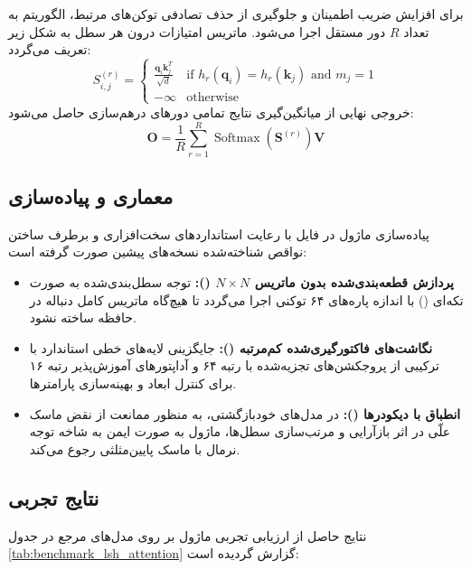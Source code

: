 برای افزایش ضریب اطمینان و جلوگیری از حذف تصادفی توکن‌های مرتبط، الگوریتم به تعداد $R$ دور مستقل اجرا می‌شود. ماتریس امتیازات درون هر سطل به شکل زیر تعریف می‌گردد:
\begin{equation}
S_{i, j}^{(r)} = \begin{cases}
\frac{\mathbf{q}_i \mathbf{k}_j^T}{\sqrt{d}} & \text{if } h_r(\mathbf{q}_i) = h_r(\mathbf{k}_j) \text{ and } m_j = 1 \\
-\infty & \text{otherwise}
\end{cases}
\end{equation}
خروجی نهایی از میانگین‌گیری نتایج تمامی دورهای درهم‌سازی حاصل می‌شود:
\begin{equation}
\mathbf{O} = \frac{1}{R} \sum_{r=1}^R \operatorname{Softmax}\left(\mathbf{S}^{(r)}\right) \mathbf{V}
\end{equation}

\subsection{معماری و پیاده‌سازی}
پیاده‌سازی ماژول  در فایل  با رعایت استانداردهای سخت‌افزاری و برطرف ساختن نواقص شناخته‌شده نسخه‌های پیشین صورت گرفته است:
\begin{itemize}
    \item \textbf{پردازش قطعه‌بندی‌شده بدون ماتریس $N \times N$ ():} توجه سطل‌بندی‌شده به صورت تکه‌ای () با اندازه پاره‌های ۶۴ توکنی اجرا می‌گردد تا هیچ‌گاه ماتریس کامل دنباله در حافظه ساخته نشود.
    \item \textbf{نگاشت‌های فاکتورگیری‌شده کم‌مرتبه ():} جایگزینی لایه‌های خطی استاندارد با ترکیبی از پروجکشن‌های تجزیه‌شده  با رتبه ۶۴ و آداپتورهای آموزش‌پذیر رتبه ۱۶ برای کنترل ابعاد و بهینه‌سازی پارامترها.
    \item \textbf{انطباق با دیکودرها ():} در مدل‌های خودبازگشتی، به منظور ممانعت از نقض ماسک علّی در اثر بازآرایی و مرتب‌سازی سطل‌ها، ماژول به صورت ایمن به شاخه توجه نرمال با ماسک پایین‌مثلثی رجوع می‌کند.
\end{itemize}

\subsection{نتایج تجربی}
نتایج حاصل از ارزیابی تجربی ماژول  بر روی مدل‌های مرجع در جدول \ref{tab:benchmark_lsh_attention} گزارش گردیده است:

